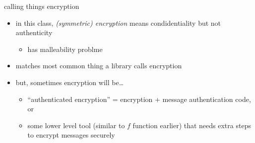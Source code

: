 \begin{frame}{calling things encryption}
    \begin{itemize}
    \item in this class, \textit{(symmetric) encryption} means condidentiality but not authenticity
        \begin{itemize}
        \item has malleability problme
        \end{itemize}
    \item matches most common thing a library calls encryption
    \vspace{.5cm}
    \item but, sometimes encryption will be\ldots
        \begin{itemize}
        \item ``authenticated encryption'' = encryption + message authentication code, or
        \item some lower level tool (similar to $f$ function earlier) that needs extra steps to encrypt messages securely
        \end{itemize}
    \end{itemize}
\end{frame}
